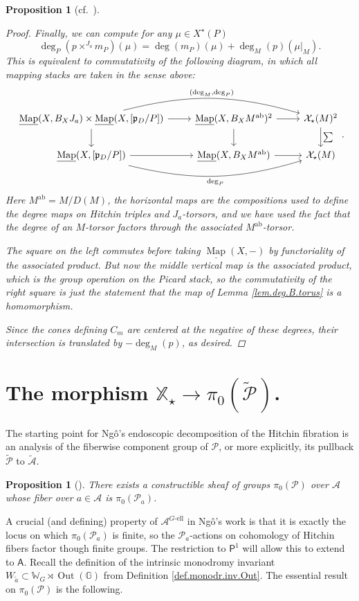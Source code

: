 \documentclass[openany]{amsbook}
\newtheorem{proposition}[theorem]{Proposition}
\theoremstyle{definition}
\theoremstyle{remark}
\numberwithin{equation}{section}
\newcommand{\G}{\mathbb{G}}
\newcommand{\W}{\mathbb{W}}
\newcommand{\cA}{\mathcal{A}}
\newcommand{\cX}{\mathcal{X}}
\newcommand{\cP}{\mathcal{P}}
\newcommand{\ul}[1]{\underline{#1}}
\renewcommand{\-}{\operatorname{-}}
\newcommand{\Out}{\operatorname{Out}}
\newcommand{\Map}{\ul{\operatorname{Map}}}
\newcommand{\wtilde}[1]{\widetilde{#1}}
\newcommand{\el}{\text{-ell}}
\newcommand{\ctA}{\widetilde{\cA}}
\newcommand{\ctP}{\widetilde{\cP}}
\newcommand{\bA}{\mathsf{A}}
\newcommand{\bX}{\mathbb{X}}
\newcommand{\bP}{\mathsf{P}}
\newcommand{\fp}{\mathfrak{p}}
\newcommand{\ab}{\mathrm{ab}}
\begin{document}
\begin{proposition}[{{cf.\ \cite[5.5.1]{CLII}}}]
\begin{proof}
        Finally, we can compute for any $\mu \in X^\star(P)$
        $$
            \deg_P(p \times^{J_a} m_P)(\mu) = \deg(m_P)(\mu) + \deg_M(p)(\mu|_M).
        $$
        This is equivalent to commutativity of the following diagram, in which all mapping stacks are taken in the sense above:
        $$
            \begin{tikzcd}[ampersand replacement=\&]
                \Map(X, B_X J_a) \times \Map(X, [\fp_D/P]) \ar[rr, bend left = 15, "{(\deg_M, \deg_P)}"] \ar[r]\ar[d] \& \Map(X, B_X M^{\ab})^2 \ar[r] \ar[d] \& \cX_\star(M)^2 \ar[d, "\sum"] \\
                \Map(X, [\fp_D/P])  \ar[rr, bend right=15, "\deg_P" below] \ar[r] \& \Map(X, B_X M^{\ab}) \ar[r] \& \cX_\star(M)
            \end{tikzcd}.
        $$
        Here $M^{\ab} = M/D(M)$, the horizontal maps are the compositions used to define the degree maps on Hitchin triples and $J_a$-torsors, and we have used the fact that the degree of an $M$-torsor factors through the associated $M^{\ab}$-torsor.

        The square on the left commutes before taking $\Map(X, -)$ by functoriality of the associated product. But now the middle vertical map is the associated product, which \textit{is} the group operation on the Picard stack, so the commutativity of the right square is just the statement that the map of Lemma \ref{lem.deg.B.torus} is a homomorphism. 

        Since the cones defining $C_m$ are centered at the negative of these degrees, their intersection is translated by $-\deg_M(p)$, as desired.
    \end{proof}
\end{proposition}




\section{\texorpdfstring{The morphism $\bX_\star \to \pi_0(\ctP)$.}{The morphism cocharacters to Picard components.}}

The starting point for Ng\^{o}'s endoscopic decomposition of the Hitchin fibration is an analysis of the fiberwise component group of $\cP$, or more explicitly, its pullback $\ctP$ to $\ctA$. 

\begin{proposition}[{{\cite[6.2]{ngoendo}}}]
    There exists a constructible sheaf of groups $\pi_0(\cP)$ over $\cA$ whose fiber over $a \in \cA$ is $\pi_0(\cP_a)$.
\end{proposition}
A crucial (and defining) property of $\cA^{G\el}$ in Ng\^{o}'s work is that it is exactly the locus on which $\pi_0(\cP_a)$ is finite, so the $\cP_a$-actions on cohomology of Hitchin fibers factor though finite groups. The restriction to $\bP^{1}$ will allow this to extend to $\bA$. Recall the definition of the intrinsic monodromy invariant $W_{\wtilde{a}} \subset \W_G \rtimes \Out(\G)$ from Definition \ref{def.monodr.inv.Out}. The essential result on $\pi_0(\cP)$ is the following. 
\end{document}
